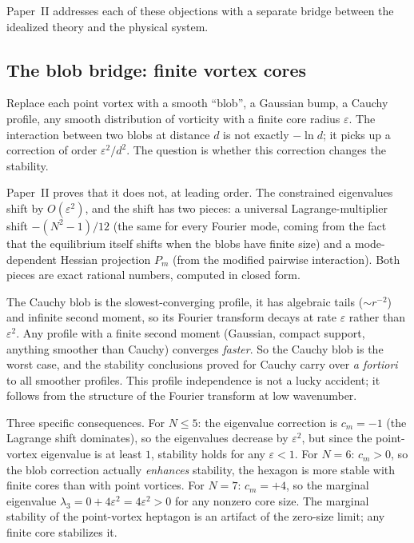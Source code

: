 Paper~II addresses each of these objections with a separate bridge
between the idealized theory and the physical system.

\subsection*{The blob bridge: finite vortex cores}

Replace each point vortex with a smooth ``blob'', a Gaussian bump, a
Cauchy profile, any smooth distribution of vorticity with a finite core
radius $\varepsilon$. The interaction between two blobs at distance $d$
is not exactly $-\ln d$; it picks up a correction of order
$\varepsilon^2/d^2$. The question is whether this correction changes
the stability.

Paper~II proves that it does not, at leading order. The constrained
eigenvalues shift by $O(\varepsilon^2)$, and the shift has two pieces:
a universal Lagrange-multiplier shift $-(N^2 - 1)/12$ (the same for
every Fourier mode, coming from the fact that the equilibrium itself
shifts when the blobs have finite size) and a mode-dependent Hessian
projection $P_m$ (from the modified pairwise interaction). Both pieces
are exact rational numbers, computed in closed form.

The Cauchy blob is the slowest-converging profile, it has algebraic
tails ($\sim r^{-2}$) and infinite second moment, so its Fourier
transform decays at rate $\varepsilon$ rather than $\varepsilon^2$.
Any profile with a finite second moment (Gaussian, compact support,
anything smoother than Cauchy) converges \emph{faster}. So the Cauchy
blob is the worst case, and the stability conclusions proved for
Cauchy carry over \emph{a fortiori} to all smoother profiles. This
profile independence is not a lucky accident; it follows from the
structure of the Fourier transform at low wavenumber.

Three specific consequences. For $N \le 5$: the eigenvalue correction
is $c_m = -1$ (the Lagrange shift dominates), so the eigenvalues
decrease by $\varepsilon^2$, but since the point-vortex eigenvalue is
at least $1$, stability holds for any $\varepsilon < 1$. For $N = 6$:
$c_m > 0$, so the blob correction actually \emph{enhances} stability, 
the hexagon is more stable with finite cores than with point vortices.
For $N = 7$: $c_m = +4$, so the marginal eigenvalue
$\lambda_3 = 0 + 4\varepsilon^2 = 4\varepsilon^2 > 0$ for any nonzero
core size. The marginal stability of the point-vortex heptagon is an
artifact of the zero-size limit; any finite core stabilizes it.

